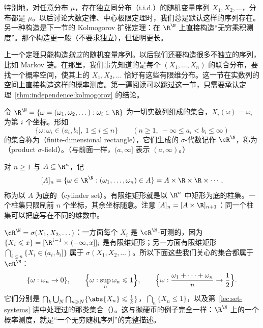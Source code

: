 \begin{remark}
特别地，对任意分布 $\mu$，存在独立同分布（i.i.d.）的随机变量序列 $X_1,X_2,\dots$，分布都是 $\mu$。以后讨论大数定律、中心极限定理时，我们总是默认这样的序列存在。另一种构造是下一节的 Kolmogorov 扩张定理：在 $\R^\N$ 上直接构造“无穷乘积测度”。那个构造更一般（不要求独立），但证明更长。
\end{remark}


上一个定理只能构造\emph{独立}的随机变量序列。以后我们还要构造很多不独立的序列，比如 Markov 链。在那里，我们事先知道的是每个 $(X_1,\dots,X_n)$ 的联合分布，要找一个概率空间，使其上的 $X_1,X_2,\dots$ 恰好有这些有限维分布。这一节在实数列的空间上直接构造这样的概率测度。第一遍阅读可以跳过这一节，只需要承认定理~\ref{thm:independence:kolmogorov} 的结论。

令 $\R^\N=\{\omega=(\omega_1,\omega_2,\dots):\omega_i\in\R\}$ 为一切实数列组成的集合，$X_i(\omega)=\omega_i$ 为第 $i$ 个坐标。形如
\[
\{\omega:\omega_i\in(a_i,b_i],\ 1\leqslant i\leqslant n\}\qquad(n\geqslant1,\ -\infty\leqslant a_i<b_i\leqslant\infty)
\]
的集合称为（finite-dimensional rectangle），它们生成的 $\sigma$-代数记作 $\cR^\N$，称为（product $\sigma$-field）。（与前面一样，$(a,\infty]$ 表示 $(a,\infty)$。）

对 $n\geqslant1$ 与 $A\subseteq\R^n$，记
\[
[A]_n=\{\omega\in\R^\N:(\omega_1,\dots,\omega_n)\in A\}=A\times\R\times\R\times\cdots,
\]
称为以 $A$ 为底的（cylinder set）。有限维矩形就是以 $\R^n$ 中矩形为底的柱集。一个柱集只限制前 $n$ 个坐标，其余坐标随意。注意 $[A]_n=[A\times\R]_{n+1}$：同一个柱集可以把底写在不同的维数中。

\begin{example}[$\cR^\N$ 中的集合]\label{ex:independence:RN-sets}
$\cR^\N=\sigma(X_1,X_2,\dots)$：一方面每个 $X_i$ 是 $\cR^\N$-可测的，因为 $\{X_i\leqslant x\}=[\R^{i-1}\times(-\infty,x]]_i$ 是有限维矩形；另一方面有限维矩形 $\bigcap_{i\leqslant n}\{X_i\in(a_i,b_i]\}$ 属于 $\sigma(X_1,X_2,\dots)$。所以下面这些我们关心的集合都属于 $\cR^\N$：
\[
\{\omega:\omega_n\to0\},\qquad\Bigl\{\omega:\sup_n\omega_n\leqslant1\Bigr\},\qquad\Bigl\{\omega:\frac{\omega_1+\cdots+\omega_n}n\to\frac12\Bigr\}.
\]
它们分别是 $\bigcap_k\bigcup_N\bigcap_{n\geqslant N}\{\abs{X_n}\leqslant\frac1k\}$，$\bigcap_n\{X_n\leqslant1\}$，以及第~\ref{lec:set-systems} 讲中处理过的那类集合（）。这与抛硬币的例子完全一样：$\R^\N$ 上的一个概率测度，就是“一个无穷随机序列”的完整描述。
\end{example}

